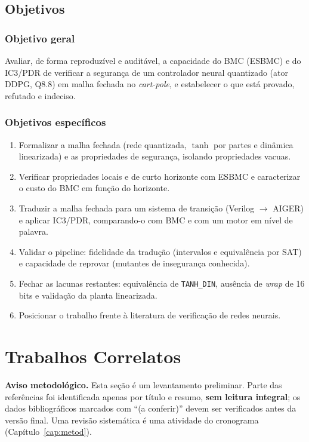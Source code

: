 \documentclass[12pt,openright,oneside,a4paper,chapter=TITLE,sumario=tradicional,english,brazil]{abntex2}
\begin{document}
\section{Objetivos}

\subsection{Objetivo geral}

Avaliar, de forma reproduzível e auditável, a capacidade do BMC (ESBMC) e do IC3/PDR de verificar a segurança de um controlador neural quantizado (ator DDPG, Q8.8) em malha fechada no \emph{cart-pole}, e estabelecer o que está provado, refutado e indeciso.

\subsection{Objetivos específicos}

\begin{enumerate}
  \item Formalizar a malha fechada (rede quantizada, $\tanh$ por partes e dinâmica linearizada) e as propriedades de segurança, isolando propriedades vacuas.
  \item Verificar propriedades locais e de curto horizonte com ESBMC e caracterizar o custo do BMC em função do horizonte.
  \item Traduzir a malha fechada para um sistema de transição (Verilog $\to$ AIGER) e aplicar IC3/PDR, comparando-o com BMC e com um motor em nível de palavra.
  \item Validar o pipeline: fidelidade da tradução (intervalos e equivalência por SAT) e capacidade de reprovar (mutantes de insegurança conhecida).
  \item Fechar as lacunas restantes: equivalência de \texttt{TANH\_DIN}, ausência de \emph{wrap} de 16 bits e validação da planta linearizada.
  \item Posicionar o trabalho frente à literatura de verificação de redes neurais.
\end{enumerate}

\chapter{Trabalhos Correlatos}\label{cap:corr}

\textbf{Aviso metodológico.} Esta seção é um levantamento preliminar. Parte das referências foi identificada apenas por título e resumo, \textbf{sem leitura integral}; os dados bibliográficos marcados com ``(a conferir)'' devem ser verificados antes da versão final. Uma revisão sistemática é uma atividade do cronograma (Capítulo~\ref{cap:metod}).
\end{document}
